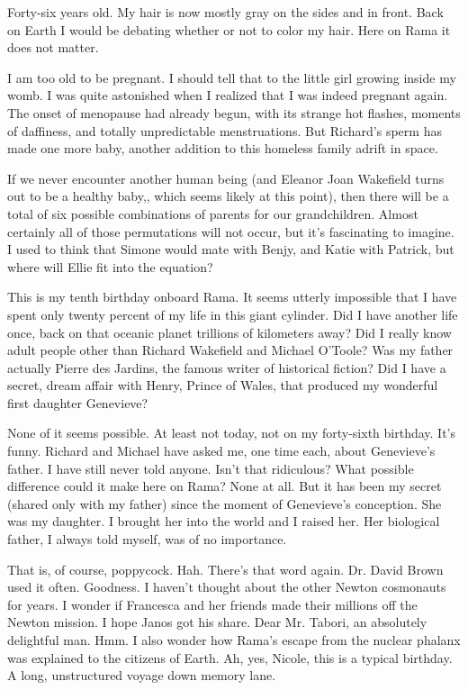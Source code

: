 \documentclass[]{article}
\begin{document}
{Forty-six years old.  My hair is now mostly gray on the sides and in front.  Back on Earth I would be debating whether or not to color my hair.  Here on Rama it does not matter.

I am too old to be pregnant.  I should tell that to the little girl growing inside my womb.  I was quite astonished when I realized that I was indeed pregnant again.  The onset of menopause had already begun, with its strange hot flashes, moments of daffiness, and totally unpredictable menstruations.  But Richard’s sperm has made one more baby, another addition to this homeless family adrift in space.

If we never encounter another human being (and Eleanor Joan Wakefield turns out to be a healthy baby,, which seems likely at this point), then there will be a total of six possible combinations of parents for our grandchildren.  Almost certainly all of those permutations will not occur, but it’s fascinating to imagine.  I used to think that Simone would mate with Benjy, and Katie with Patrick, but where will Ellie fit into the equation?

This is my tenth birthday onboard Rama.  It seems utterly impossible that I have spent only twenty percent of my life in this giant cylinder.  Did I have another life once, back on that oceanic planet trillions of kilometers away? Did I really know adult people other than Richard Wakefield and Michael O’Toole? Was my father actually Pierre des Jardins, the famous writer of historical fiction? Did I have a secret, dream affair with Henry, Prince of Wales, that produced my wonderful first daughter Genevieve?

None of it seems possible.  At least not today, not on my forty-sixth birthday.  It’s funny.  Richard and Michael have asked me, one time each, about Genevieve’s father.  I have still never told anyone.  Isn’t that ridiculous? What possible difference could it make here on Rama? None at all.  But it has been my secret (shared only with my father) since the moment of Genevieve’s conception.  She was my daughter.  I brought her into the world and I raised her.  Her biological father, I always told myself, was of no importance.

That is, of course, poppycock.  Hah.  There’s that word again.  Dr.  David Brown used it often.  Goodness.  I haven’t thought about the other Newton cosmonauts for years.  I wonder if Francesca and her friends made their millions off the Newton mission.  I hope Janos got his share.  Dear Mr.  Tabori, an absolutely delightful man.  Hmm.  I also wonder how Rama’s escape from the nuclear phalanx was explained to the citizens of Earth.  Ah, yes, Nicole, this is a typical birthday.  A long, unstructured voyage down memory lane.

}
\end{document}

